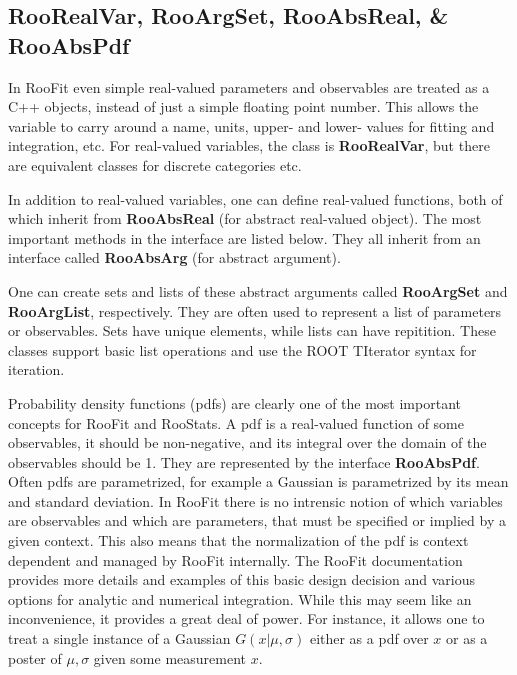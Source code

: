 \documentclass[11pt]{article}
\begin{document}
\subsection{RooRealVar, RooArgSet,  RooAbsReal, \& RooAbsPdf}

In RooFit even simple real-valued parameters and observables are treated as a C++ objects, instead of just a simple floating point number.  This allows the variable to carry around a name, units, upper- and lower- values for fitting and integration, etc.  For real-valued variables, the class is \textbf{RooRealVar}, but there are equivalent classes for discrete categories etc.  

In addition to real-valued variables, one can define real-valued functions, both of which inherit from \textbf{RooAbsReal} (for abstract real-valued object).  The most important methods in the interface are listed below.  They all inherit from an interface called \textbf{RooAbsArg} (for abstract argument).  



One can create sets and lists of these abstract arguments called \textbf{RooArgSet} and \textbf{RooArgList}, respectively.  They are often used to represent a list of parameters or observables.  Sets have unique elements, while lists can have repitition.  These classes support basic list operations and use the ROOT TIterator syntax for iteration.

Probability density functions (pdfs) are clearly one of the most important concepts for RooFit and RooStats.    A pdf is a real-valued function of some observables, it should be non-negative, and its integral over the domain of the observables should be 1.  They are represented by the interface \textbf{RooAbsPdf}.  Often pdfs are parametrized, for example a Gaussian is parametrized by its mean and standard deviation.  In RooFit there is no intrensic notion of which variables are observables and which are parameters, that must be specified or implied by a given context.  This also means that the normalization of the pdf is context dependent and managed by RooFit internally.  The RooFit documentation provides more details and examples of this basic design decision and various options for analytic and numerical integration.  While this may seem like an inconvenience, it provides a great deal of power.  For instance, it allows one to treat a single instance of a Gaussian $G(x|\mu,\sigma)$ either as a pdf over $x$ or as a poster of $\mu,\sigma$ given some measurement $x$.
\end{document}
